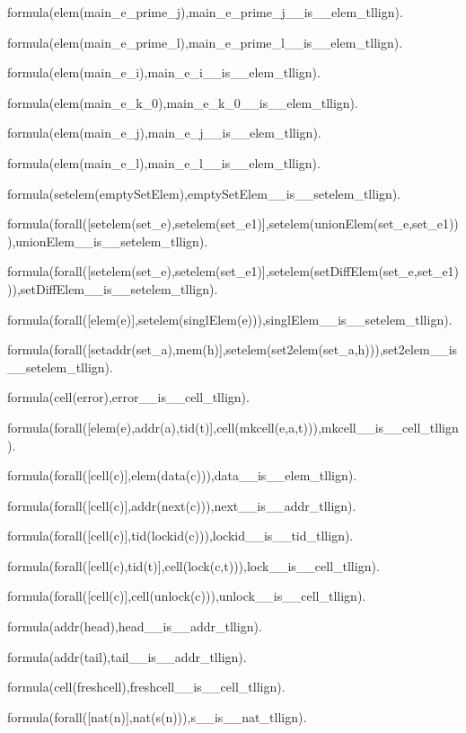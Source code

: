formula(elem(main\_e\_prime\_j),main\_e\_prime\_j\_\_is\_\_elem\_tllign).

formula(elem(main\_e\_prime\_l),main\_e\_prime\_l\_\_is\_\_elem\_tllign).

formula(elem(main\_e\_i),main\_e\_i\_\_is\_\_elem\_tllign).

formula(elem(main\_e\_k\_0),main\_e\_k\_0\_\_is\_\_elem\_tllign).

formula(elem(main\_e\_j),main\_e\_j\_\_is\_\_elem\_tllign).

formula(elem(main\_e\_l),main\_e\_l\_\_is\_\_elem\_tllign).


formula(setelem(emptySetElem),emptySetElem\_\_is\_\_setelem\_tllign).

formula(forall([setelem(set\_e),setelem(set\_e1)],setelem(unionElem(set\_e,set\_e1))),unionElem\_\_is\_\_setelem\_tllign).

formula(forall([setelem(set\_e),setelem(set\_e1)],setelem(setDiffElem(set\_e,set\_e1))),setDiffElem\_\_is\_\_setelem\_tllign).

formula(forall([elem(e)],setelem(singlElem(e))),singlElem\_\_is\_\_setelem\_tllign).

formula(forall([setaddr(set\_a),mem(h)],setelem(set2elem(set\_a,h))),set2elem\_\_is\_\_setelem\_tllign).


formula(cell(error),error\_\_is\_\_cell\_tllign).

formula(forall([elem(e),addr(a),tid(t)],cell(mkcell(e,a,t))),mkcell\_\_is\_\_cell\_tllign).

formula(forall([cell(c)],elem(data(c))),data\_\_is\_\_elem\_tllign).

formula(forall([cell(c)],addr(next(c))),next\_\_is\_\_addr\_tllign).

formula(forall([cell(c)],tid(lockid(c))),lockid\_\_is\_\_tid\_tllign).

formula(forall([cell(c),tid(t)],cell(lock(c,t))),lock\_\_is\_\_cell\_tllign).

formula(forall([cell(c)],cell(unlock(c))),unlock\_\_is\_\_cell\_tllign).

formula(addr(head),head\_\_is\_\_addr\_tllign).

formula(addr(tail),tail\_\_is\_\_addr\_tllign).

formula(cell(freshcell),freshcell\_\_is\_\_cell\_tllign).


formula(forall([nat(n)],nat(s(n))),s\_\_is\_\_nat\_tllign).

